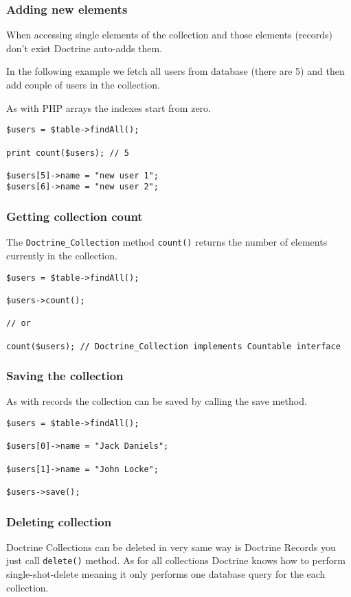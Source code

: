 \documentclass[11pt,a4paper]{report}
\begin{document}
\subsubsection{Adding new elements}
When accessing single elements of the collection and those elements (records) don't exist Doctrine auto-adds them.

In the following example we fetch all users from database (there are 5) and then add couple of users in the collection.

As with PHP arrays the indexes start from zero.

\begin{verbatim}
$users = $table->findAll();

print count($users); // 5

$users[5]->name = "new user 1";
$users[6]->name = "new user 2";
\end{verbatim}

\subsubsection{Getting collection count}
The \texttt{Doctrine\_Collection} method \texttt{count()} returns the number of elements currently in the collection.

\begin{verbatim}
$users = $table->findAll();

$users->count();

// or

count($users); // Doctrine_Collection implements Countable interface
\end{verbatim}

\subsubsection{Saving the collection}
As with records the collection can be saved by calling the save method.

\begin{verbatim}
$users = $table->findAll();

$users[0]->name = "Jack Daniels";

$users[1]->name = "John Locke";

$users->save();
\end{verbatim}

\subsubsection{Deleting collection}
Doctrine Collections can be deleted in very same way is Doctrine Records you just call \texttt{delete()} method. As for all collections Doctrine knows how to perform single-shot-delete meaning it only performs one database query for the each collection.
\end{document}
